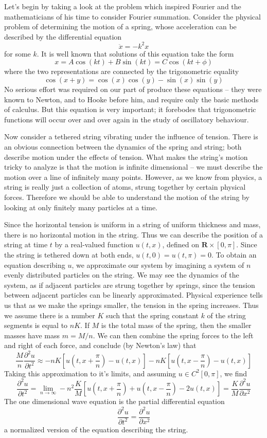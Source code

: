 Let's begin by taking a look at the problem which inspired Fourier and the mathematicians of his time to consider Fourier summation. Consider the physical problem of determining the motion of a spring, whose acceleration can be described by the differential equation
%
\[ \ddot{x} = -k^2x \]
%
for some $k$. It is well known that solutions of this equation take the form
%
\[ x = A \cos(kt) + B \sin(kt) = C \cos(kt + \phi) \]
%
where the two representations are connected by the trigonometric equality
%
\[ \cos(x + y) = \cos(x) \cos(y) - \sin(x) \sin(y) \]
%
No serious effort was required on our part of produce these equations -- they were known to Newton, and to Hooke before him, and require only the basic methods of calculus. But this equation is very important; it forebodes that trigonometric functions will occur over and over again in the study of oscillatory behaviour.

Now consider a tethered string vibrating under the influence of tension. There is an obvious connection between the dynamics of the spring and string; both describe motion under the effects of tension. What makes the string's motion tricky to analyze is that the motion is infinite dimensional -- we must describe the motion over a line of infinitely many points. However, as we know from physics, a string is really just a collection of atoms, strung together by certain physical forces. Therefore we should be able to understand the motion of the string by looking at only finitely many particles at a time.

Since the horizontal tension is uniform in a string of uniform thickness and mass, there is no horizontal motion in the string. Thus we can describe the position of a string at time $t$ by a real-valued function $u(t,x)$, defined on $\mathbf{R} \times [0,\pi]$. Since the string is tethered down at both ends, $u(t,0) = u(t,\pi) = 0$. To obtain an equation describing $u$, we approximate our system by imagining a system of $n$ evenly distributed particles on the string. We may see the dynamics of the system, as if adjacent particles are strung together by springs, since the tension between adjacent particles can be linearly approximated. Physical experience tells us that as we make the springs smaller, the tension in the spring increases. Thus we assume there is a number $K$ such that the spring constant $k$ of the string segments is equal to $nK$. If $M$ is the total mass of the spring, then the smaller masses have mass $m = M/n$. We can then combine the spring forces to the left and right of each force, and conclude (by Newton's law) that
%
\[ \frac{M}{n} \frac{\partial^2 u}{\partial t^2} \approx - nK \left[u\left(t, x + \frac{\pi}{n}\right) - u(t, x)\right] - nK \left[ u\left(t, x - \frac{\pi}{n}\right) - u(t, x) \right] \]
%
Taking this approximation to it's limits, and assuming $u \in C^2[0,\pi]$, we find
%
\[ \frac{\partial^2 u}{\partial t^2} = \lim_{n \to \infty} -n^2 \frac{K}{M} \left[ u\left(t, x + \frac{\pi}{n}\right) + u\left(t,x - \frac{\pi}{n}\right) - 2u(t,x) \right] = \frac{K}{M} \frac{\partial^2 u}{\partial x^2} \]
%
The one dimensional wave equation is the partial differential equation
%
\[ \frac{\partial^2 u}{\partial t^2} = \frac{\partial^2 u}{\partial x^2} \]
%
a normalized version of the equation describing the string.

